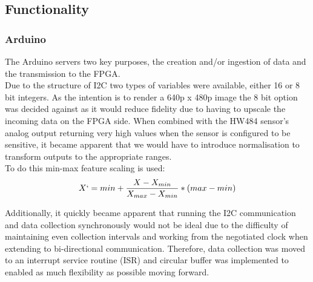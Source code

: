 \documentclass{article}
\begin{document}







\newpage
\subsection{Functionality}
\subsubsection{Arduino}
The Arduino servers two key purposes, the creation and/or ingestion of data and the transmission to the FPGA.\\

Due to the structure of I2C two types of variables were available, either 16 or 8 bit integers. As the intention is to render a 640p x 480p image the 8 bit option was decided against as it would reduce fidelity due to having to upscale the incoming data on the FPGA side. When combined with the HW484 sensor's analog output returning very high values when the sensor is configured to be sensitive, it became apparent that we would have to introduce normalisation to transform outputs to the appropriate ranges.\\

To do this min-max feature scaling is used:\\
\begin{displaymath}
    \centering
    X` = min + \frac{X - X_{min}}{X_{max} - X_{min}} * (max - min)
\end{displaymath}

Additionally, it quickly became apparent that running the I2C communication and data collection synchronously would not be ideal due to the difficulty of maintaining even collection intervals and working from the negotiated clock when extending to bi-directional communication. Therefore, data collection was moved to an interrupt service routine (ISR) and circular buffer was implemented to enabled as much flexibility as possible moving forward.\\
\newpage
\end{document}
